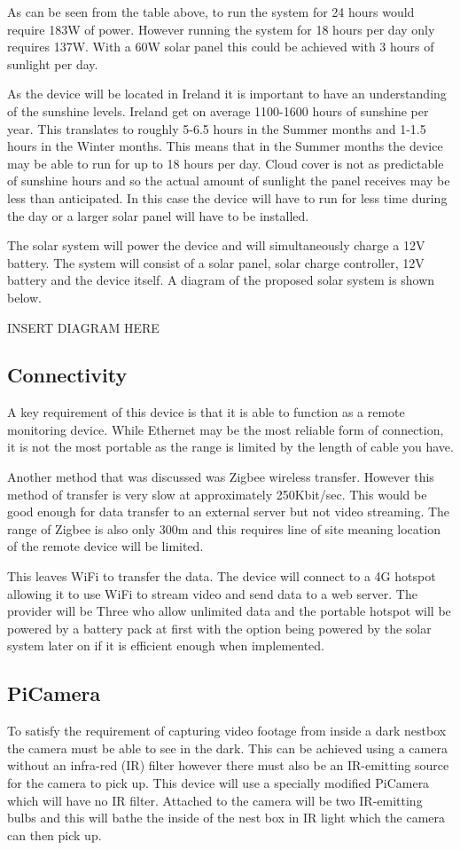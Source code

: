 \documentclass[10pt,a4paper]{article}
\begin{document}
As can be seen from the table above, to run the system for 24 hours would require 183W of power. However running the system for 18 hours per day only requires 137W. With a 60W solar panel this could be achieved with 3 hours of sunlight per day. 

As the device will be located in Ireland it is important to have an understanding of the sunshine levels. Ireland get on average 1100-1600 hours of sunshine per year\citep{website:metsunshine}. This translates to roughly 5-6.5 hours in the Summer months and 1-1.5 hours in the Winter months. This means that in the Summer months the device may be able to run for up to 18 hours per day. Cloud cover is not as predictable of sunshine hours and so the actual amount of sunlight the panel receives may be less than anticipated. In this case the device will have to run for less time during the day or a larger solar panel will have to be installed. 

The solar system will power the device and will simultaneously charge a 12V battery. The system will consist of a solar panel, solar charge controller, 12V battery and the device itself. A diagram of the proposed solar system is shown below. 

INSERT DIAGRAM HERE

\subsection{Connectivity}
A key requirement of this device is that it is able to function as a remote monitoring device. While Ethernet may be the most reliable form of connection, it is not the most portable as the range is limited by the length of cable you have. 

Another method that was discussed was Zigbee wireless transfer. However this method of transfer is very slow at approximately 250Kbit/sec. This would be good enough for data transfer to an external server but not video streaming. The range of Zigbee is also only 300m and this requires line of site meaning location of the remote device will be limited. 

This leaves WiFi to transfer the data. The device will connect to a 4G hotspot allowing it to use WiFi to stream video and send data to a web server. The provider will be Three who allow unlimited data and the portable hotspot will be powered by a battery pack at first with the option being powered by the solar system later on if it is efficient enough when implemented. 

\subsection{PiCamera}
To satisfy the requirement of capturing video footage from inside a dark nestbox the camera must be able to see in the dark. This can be achieved using a camera without an infra-red (IR) filter however there must also be an IR-emitting source for the camera to pick up. This device will use a specially modified PiCamera which will have no IR filter. Attached to the camera will be two IR-emitting bulbs and this will bathe the inside of the nest box in IR light which the camera can then pick up. 
\end{document}
